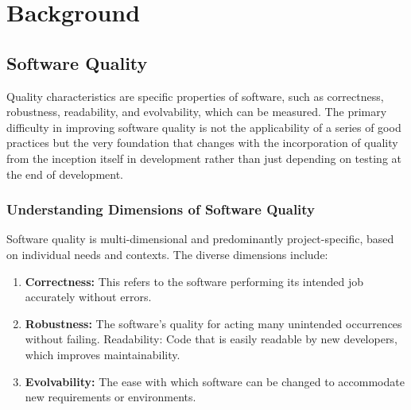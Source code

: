 
%

\chapter{Background}
\label{cha:Background}


\section{Software Quality}

Quality characteristics are specific properties of software, such as correctness, robustness, readability, and evolvability, which can be measured. The primary difficulty in improving software quality is not the applicability of a series of good practices but the very foundation that changes with the incorporation of quality from the inception itself in development rather than just depending on testing at the end of development.

\subsection{Understanding Dimensions of Software Quality}

Software quality is multi-dimensional and predominantly project-specific, based on individual needs and contexts. The diverse dimensions include:

\begin{enumerate}
    \item \textbf{Correctness:} This refers to the software performing its intended job accurately without errors.

    \item \textbf{Robustness:} The software's quality for acting many unintended occurrences without failing. Readability: Code that is easily readable by new developers, which improves maintainability.

    \item \textbf{Evolvability:} The ease with which software can be changed to accommodate new requirements or environments.
\end{enumerate}


